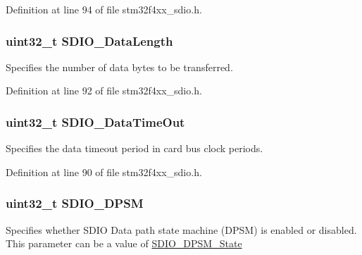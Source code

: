 Definition at line 94 of file stm32f4xx\-\_\-sdio.\-h.

\hypertarget{struct_s_d_i_o___data_init_type_def_a027631b174bafc0a746bf62446487fc9}{
\subsubsection[{S\-D\-I\-O\-\_\-\-Data\-Length}]{\setlength{\rightskip}{0pt plus 5cm}uint32\-\_\-t S\-D\-I\-O\-\_\-\-Data\-Length}}\label{struct_s_d_i_o___data_init_type_def_a027631b174bafc0a746bf62446487fc9}
Specifies the number of data bytes to be transferred. 

Definition at line 92 of file stm32f4xx\-\_\-sdio.\-h.

\hypertarget{struct_s_d_i_o___data_init_type_def_aa02f4539b152bbc3d94bb65a563d302c}{
\subsubsection[{S\-D\-I\-O\-\_\-\-Data\-Time\-Out}]{\setlength{\rightskip}{0pt plus 5cm}uint32\-\_\-t S\-D\-I\-O\-\_\-\-Data\-Time\-Out}}\label{struct_s_d_i_o___data_init_type_def_aa02f4539b152bbc3d94bb65a563d302c}
Specifies the data timeout period in card bus clock periods. 

Definition at line 90 of file stm32f4xx\-\_\-sdio.\-h.

\hypertarget{struct_s_d_i_o___data_init_type_def_a3f78865ad5cf3c8d1747faeeb3280d7e}{
\subsubsection[{S\-D\-I\-O\-\_\-\-D\-P\-S\-M}]{\setlength{\rightskip}{0pt plus 5cm}uint32\-\_\-t S\-D\-I\-O\-\_\-\-D\-P\-S\-M}}\label{struct_s_d_i_o___data_init_type_def_a3f78865ad5cf3c8d1747faeeb3280d7e}
Specifies whether S\-D\-I\-O Data path state machine (D\-P\-S\-M) is enabled or disabled. This parameter can be a value of \hyperlink{group___s_d_i_o___d_p_s_m___state}{S\-D\-I\-O\-\_\-\-D\-P\-S\-M\-\_\-\-State} 

